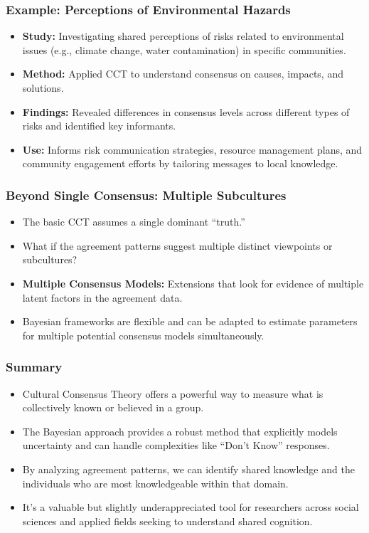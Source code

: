 \documentclass[aspectratio=169]{beamer}
\begin{document}
\begin{frame}
    \frametitle{Example: Perceptions of Environmental Hazards}
    \begin{itemize}
        \item \textbf{Study:} Investigating shared perceptions of risks related to environmental issues (e.g., climate change, water contamination) in specific communities.
        \item \textbf{Method:} Applied CCT to understand consensus on causes, impacts, and solutions.
        \item \textbf{Findings:} Revealed differences in consensus levels across different types of risks and identified key informants.
        \item \textbf{Use:} Informs risk communication strategies, resource management plans, and community engagement efforts by tailoring messages to local knowledge.
    \end{itemize}
\end{frame}

\begin{frame}
    \frametitle{Beyond Single Consensus: Multiple Subcultures}
    \begin{itemize}
        \item The basic CCT assumes a single dominant ``truth.''
        \item What if the agreement patterns suggest multiple distinct viewpoints or subcultures?
        \item \textbf{Multiple Consensus Models:} Extensions that look for evidence of multiple latent factors in the agreement data.
        \item Bayesian frameworks are flexible and can be adapted to estimate parameters for multiple potential consensus models simultaneously.
    \end{itemize}
\end{frame}


\begin{frame}
    \frametitle{Summary}
    \begin{itemize}
        \item Cultural Consensus Theory offers a powerful way to measure what is collectively known or believed in a group.
        \item The Bayesian approach provides a robust method that explicitly models uncertainty and can handle complexities like ``Don't Know'' responses.
        \item By analyzing agreement patterns, we can identify shared knowledge and the individuals who are most knowledgeable within that domain.
        \item It's a valuable but slightly underappreciated tool for researchers across social sciences and applied fields seeking to understand shared cognition.
    \end{itemize}
\end{frame}


\maketitle
\end{document}
